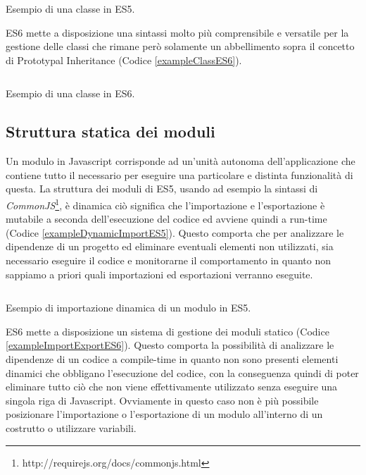 \begin{listing}[ht]
\inputminted{Javascript}{sources/examplePrototypeInheritanceES5.js}
\caption{Esempio di una classe in ES5.}
\label{examplePrototypeInheritanceES5}
\end{listing}

ES6 mette a disposizione una sintassi molto più comprensibile e versatile per la gestione delle classi che rimane però solamente un abbellimento sopra il concetto di Prototypal Inheritance (Codice \ref{exampleClassES6}). 

\begin{listing}[ht]
\inputminted{Javascript}{sources/exampleClassES6.js}
\caption{Esempio di una classe in ES6.}
\label{exampleClassES6}
\end{listing}

\subsection{Struttura statica dei moduli}
\label{strutturaStaticaDeiModuli}
Un modulo in Javascript corrisponde ad un'unità autonoma dell'applicazione che contiene tutto il necessario per eseguire una particolare e distinta funzionalità di questa. La struttura dei moduli di ES5, usando ad esempio la sintassi di \textit{CommonJS}\footnote{http://requirejs.org/docs/commonjs.html}, è dinamica ciò significa che l'importazione e l'esportazione è mutabile a seconda dell'esecuzione del codice ed avviene quindi a run-time (Codice \ref{exampleDynamicImportES5}). Questo comporta che per analizzare le dipendenze di un progetto ed eliminare eventuali elementi non utilizzati, sia necessario eseguire il codice e monitorarne il comportamento in quanto non sappiamo a priori quali importazioni ed esportazioni verranno eseguite.

\begin{listing}[ht]
\inputminted{Javascript}{sources/exampleDynamicImportES5.js}
\caption{Esempio di importazione dinamica di un modulo in ES5.} 
\label{exampleDynamicImportES5}
\end{listing}

ES6 mette a disposizione un sistema di gestione dei moduli statico (Codice \ref{exampleImportExportES6}). Questo comporta la possibilità di analizzare le dipendenze di un codice a compile-time in quanto non sono presenti elementi dinamici che obbligano l'esecuzione del codice, con la conseguenza quindi di poter eliminare tutto ciò che non viene effettivamente utilizzato senza eseguire una singola riga di Javascript.
Ovviamente in questo caso non è più possibile posizionare l'importazione o l'esportazione di un modulo all'interno di un costrutto o utilizzare variabili.

